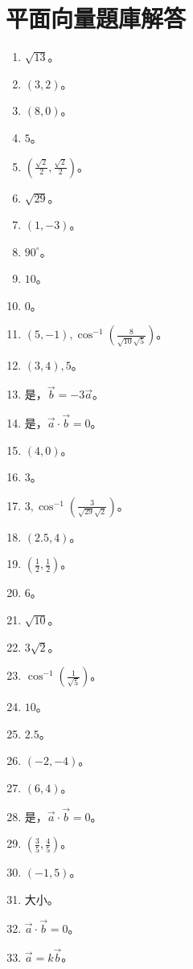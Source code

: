 \section{平面向量題庫解答}
\begin{enumerate}[label=\arabic*.]
    \item $\sqrt{13}$。
    \item $(3, 2)$。
    \item $(8, 0)$。
    \item $5$。
    \item $\left(\frac{\sqrt{2}}{2}, \frac{\sqrt{2}}{2}\right)$。
    \item $\sqrt{29}$。
    \item $(1, -3)$。
    \item $90^\circ$。
    \item $10$。
    \item $0$。
    \item $(5, -1), \cos^{-1}\left(\frac{8}{\sqrt{10} \sqrt{5}}\right)$。
    \item $(3, 4), 5$。
    \item 是，$\vec{b} = -3\vec{a}$。
    \item 是，$\vec{a} \cdot \vec{b} = 0$。
    \item $(4, 0)$。
    \item $3$。
    \item $3, \cos^{-1}\left(\frac{3}{\sqrt{29} \sqrt{2}}\right)$。
    \item $(2.5, 4)$。
    \item $\left(\frac{1}{2}, \frac{1}{2}\right)$。
    \item $6$。
    \item $\sqrt{10}$。
    \item $3\sqrt{2}$。
    \item $\cos^{-1}\left(\frac{1}{\sqrt{5}}\right)$。
    \item $10$。
    \item $2.5$。
    \item $(-2, -4)$。
    \item $(6, 4)$。
    \item 是，$\vec{a} \cdot \vec{b} = 0$。
    \item $\left(\frac{3}{5}, \frac{4}{5}\right)$。
    \item $(-1, 5)$。
    \item 大小。
    \item $\vec{a} \cdot \vec{b} = 0$。
    \item $\vec{a} = k\vec{b}$。

\end{enumerate}
